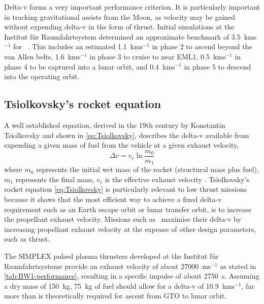 Delta-v forms a very important performance criterion. It is particularly important in tracking gravitational assists from the Moon, as velocity may be gained without expending delta-v in the form of thrust. Initial simulations at the Institut f\"{u}r Raumfahrtsystem determined an approximate benchmark of 3.5~kms$^{-1}$ for \BW\ \parencite{Roeser2006}. This includes an estimated 1.1~kms$^{-1}$ in phase 2 to ascend beyond the van Allen belts, 1.6~kms$^{-1}$ in phase 3 to cruise to near EML1, 0.5~kms$^{-1}$ in phase 4 to be captured into a lunar orbit, and 0.4~kms$^{-1}$ in phase 5 to descend into the operating orbit.

\subsection{Tsiolkovsky's rocket equation} \label{sec:Tsiolkovsky}

A well established equation, derived in the 19th century by Konstantin Tsiolkovsky and shown in \eqref{eq:Tsiolkovsky}, describes the delta-v available from expending a given mass of fuel from the vehicle at a given exhaust velocity,
\begin{equation}\label{eq:Tsiolkovsky}
\Delta v=v_{e}\ln\frac{m_{0}}{m_{1}}
\end{equation}
where $m_{0}$ represents the initial wet mass of the rocket (structural mass plus fuel), $m_{1}$ represents the final mass, $v_{e}$ is the effective exhaust velocity \parencite{Tsiolkovsky1903,Chobotov2002}. Tsiolkovsky's rocket equation \eqref{eq:Tsiolkovsky} is particularly relevant to low thrust missions because it shows that the most efficient way to achieve a fixed delta-v requirement such as an Earth escape orbit or lunar transfer orbit, is to increase the propellant exhaust velocity. Missions such as \BW\ maximise their delta-v by increasing propellant exhaust velocity at the expense of other design parameters, such as thrust.

The SIMPLEX pulsed plasma thrusters developed at the Institut f\"{u}r Raumfahrtsysteme \parencite{Nawaz2008} provide an exhaust velocity of about 27000~ms$^{-1}$ as stated in \autoref{tab:BW1-performance}, resulting in a specific impulse of about 2750~s. Assuming a dry mass of 150~kg, 75~kg of fuel should allow for a delta-v of 10.9~kms$^{-1}$, far more than is theoretically required for ascent from GTO to lunar orbit.




